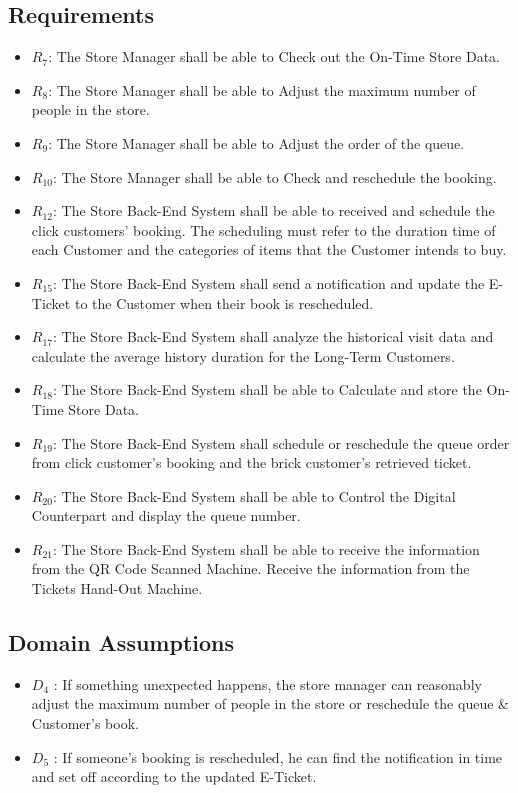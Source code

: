 \documentclass[a4paper,12pt]{report}
\begin{document}
\subsection{Requirements}
\begin{itemize}
	\item $R_7$: The Store Manager shall be able to Check out the On-Time Store Data.
	\item $R_8$: The Store Manager shall be able to Adjust the maximum number of people in the store.
	\item $R_9$: The Store Manager shall be able to Adjust the order of the queue.
	\item $R_{10}$: The Store Manager shall be able to Check and reschedule the booking.
	\item $R_{12}$: The Store Back-End System shall be able to received and schedule the click customers' booking. The scheduling must refer to the duration time of each Customer and the categories of items that the Customer intends to buy.
	\item $R_{15}$: The Store Back-End System shall send a notification and update the E-Ticket to the Customer when their book is rescheduled.
	\item $R_{17}$: The Store Back-End System shall analyze the historical visit data and calculate the average history duration for the Long-Term Customers.
	\item $R_{18}$: The Store Back-End System shall be able to Calculate and store the On-Time Store Data.
	\item $R_{19}$: The Store Back-End System shall schedule or reschedule the queue order from click customer's booking and the brick customer's retrieved ticket.
	\item $R_{20}$: The Store Back-End System shall be able to Control the Digital Counterpart and display the queue number.
	\item $R_{21}$: The Store Back-End System shall be able to receive the information from the QR Code Scanned Machine. Receive the information from the Tickets Hand-Out Machine.
\end{itemize}

\subsection{Domain Assumptions}
\begin{itemize}
	\item $D_4$ : If something unexpected happens, the store manager can reasonably adjust the maximum number of people in the store or reschedule the queue \& Customer's book.
	\item $D_5$ : If someone's booking is rescheduled, he can find the notification in time and set off according to the updated E-Ticket.
\end{itemize}
\end{document}
